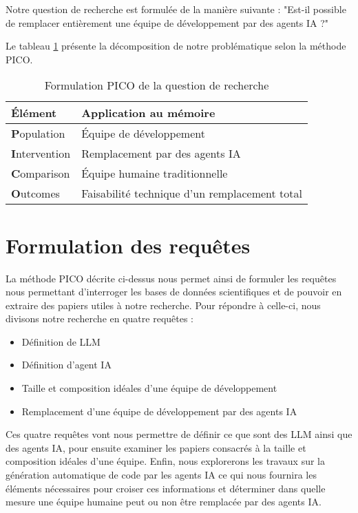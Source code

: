 Notre question de recherche est formulée de la manière suivante : "Est-il possible de remplacer entièrement une équipe de développement par des agents IA ?"

Le tableau \ref{PICO} présente la décomposition de notre problématique selon la méthode PICO.

\begin{table}[H]
\centering
\begin{tabular}{|p{4cm}|p{9cm}|}
  \hline
  \textbf{Élément} & \textbf{Application au mémoire} \\
  \hline
  \textbf{P}opulation & Équipe de développement \\
  \hline
  \textbf{I}ntervention & Remplacement par des agents IA \\
  \hline
  \textbf{C}omparison & Équipe humaine traditionnelle \\
  \hline
  \textbf{O}utcomes & Faisabilité technique d’un remplacement total \\
  \hline
\end{tabular}
\caption{Formulation PICO de la question de recherche}
\label{PICO}
\end{table}

\section{Formulation des requêtes}

La méthode PICO décrite ci-dessus nous permet ainsi de formuler les requêtes nous permettant d'interroger les bases de données scientifiques et de pouvoir en extraire des papiers utiles à notre recherche. Pour répondre à celle-ci, nous divisons notre recherche en quatre requêtes :

\begin{itemize}
    \item Définition de LLM
    \item Définition d'agent IA
    \item Taille et composition idéales d'une équipe de développement
    \item Remplacement d'une équipe de développement par des agents IA
\end{itemize}

Ces quatre requêtes vont nous permettre de définir ce que sont des LLM ainsi que des agents IA, pour ensuite examiner les papiers consacrés à la taille et composition idéales d'une équipe. Enfin, nous explorerons les travaux sur la génération automatique de code par les agents IA ce qui nous fournira les éléments nécessaires pour croiser ces informations et déterminer dans quelle mesure une équipe humaine peut ou non être remplacée par des agents IA.

